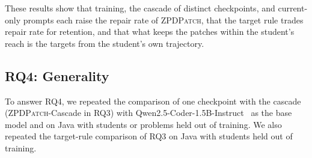 \documentclass[conference]{IEEEtran}
\begin{document}
These results show that training, the cascade of distinct checkpoints, and current-only prompts each raise the repair rate of \textsc{ZPDPatch}, that the target rule trades repair rate for retention, and that what keeps the patches within the student's reach is the targets from the student's own trajectory.

\subsection{RQ4: Generality}
\label{sec:generality}

To answer RQ4, we repeated the comparison of one checkpoint with the cascade (\textsc{ZPDPatch}-Cascade in RQ3) with Qwen2.5-Coder-1.5B-Instruct~\cite{hui2024qwen2} as the base model and on Java with students or problems held out of training. We also repeated the target-rule comparison of RQ3 on Java with students held out of training.
\end{document}
